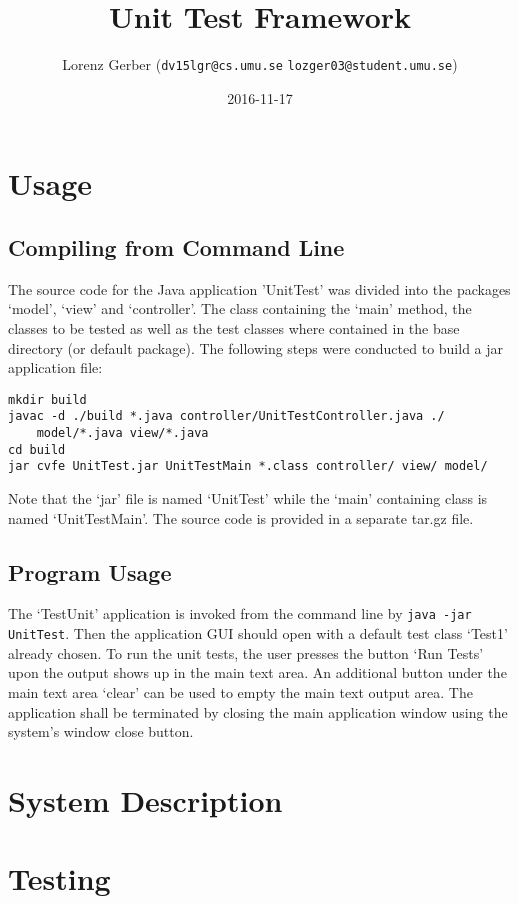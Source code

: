 \documentclass[a4paper,11pt,twoside]{article}
\title{Unit Test Framework}
\author{Lorenz Gerber ({\tt{dv15lgr@cs.umu.se}} {\tt{lozger03@student.umu.se}})}
\date{2016-11-17}
\begin{document}
\lstset{language=C}
\maketitle
\thispagestyle{empty}
\newpage
\tableofcontents
\thispagestyle{empty}
\newpage

\clearpage
{}

\section{Usage} 
\subsection{Compiling from Command Line}
The source code for the Java application 'UnitTest' was divided into the packages `model', `view' and `controller'. The class containing the `main' method, the classes to be tested as well as the test classes where contained in the base directory (or default package). The following steps were conducted to build a jar application file:
\begin{verbatim}
mkdir build
javac -d ./build *.java controller/UnitTestController.java ./
    model/*.java view/*.java
cd build
jar cvfe UnitTest.jar UnitTestMain *.class controller/ view/ model/
\end{verbatim} 
Note that the `jar' file is named `UnitTest' while the `main' containing class is named `UnitTestMain'.
The source code is provided in a separate tar.gz file.

\subsection{Program Usage}
The `TestUnit' application is invoked from the command line by \verb+java -jar UnitTest+. Then the application GUI should open with a default test class `Test1' already chosen. To run the unit tests, the user presses the button `Run Tests' upon the output shows up in the main text area. An additional button under the main text area `clear' can be used to empty the main text output area. The application shall be terminated by closing the main application window using the system's window close button.

\section{System Description}

\section{Testing}



\end{document}
